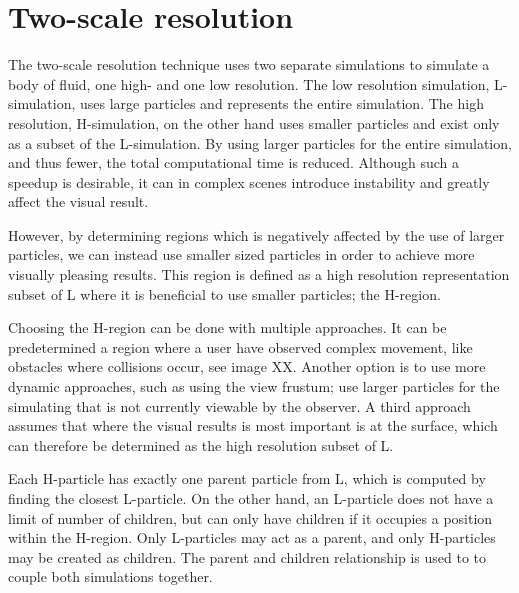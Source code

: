 \documentclass[../../main.tex]{subfiles}
\begin{document}
    
    


\section{Two-scale resolution}
The two-scale resolution technique uses two separate simulations to simulate a body of fluid, one high- and one low resolution. The low resolution simulation, L-simulation, uses large particles and represents the entire simulation. The high resolution, H-simulation, on the other hand uses smaller particles and exist only as a subset of the L-simulation. By using larger particles for the entire simulation, and thus fewer, the total computational time is reduced. Although such a speedup is desirable, it can in complex scenes introduce instability and greatly affect the visual result. 

However, by determining regions which is negatively affected by the use of larger particles, we can instead use smaller sized particles in order to achieve more visually pleasing results. This region is defined as a high resolution representation subset of L where it is beneficial to use smaller particles; the H-region.

Choosing the H-region can be done with multiple approaches. It can be predetermined a region where a user have observed complex movement, like obstacles where collisions occur, see image XX. Another option is to use more dynamic approaches, such as using the view frustum; use larger particles for the simulating that is not currently viewable by the observer. A third approach assumes that where the visual results is most important is at the surface, which can therefore be determined as the high resolution subset of L.

Each H-particle has exactly one parent particle from L, which is computed by finding the closest L-particle. On the other hand, an L-particle does not have a limit of number of children, but can only have children if it occupies a position within the H-region. Only L-particles may act as a parent, and only H-particles may be created as children. The parent and children relationship is used to to couple both simulations together.
\end{document}
